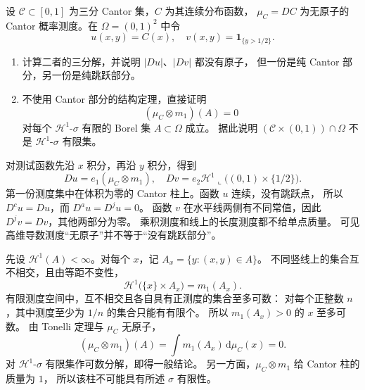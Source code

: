 \begin{exercise}\label{b1:ex:28-cantor-cylinder-and-atoms}
设 \(\mathcal C\subset[0,1]\) 为三分 Cantor 集，\(C\) 为其连续分布函数，
\(\mu_C=DC\) 为无原子的 Cantor 概率测度。在 \(\Omega=(0,1)^2\) 中令
\[
 u(x,y)=C(x),\quad v(x,y)=\mathbf1_{\{y>1/2\}}.
\]
\begin{enumerate}
\item\label{b1:item:28-cantor-cylinder-decomposition}
计算二者的三分解，并说明 \(|Du|\)、\(|Dv|\) 都没有原子，
但一份是纯 Cantor 部分，另一份是纯跳跃部分。
\item\label{b1:item:28-cantor-cylinder-diffuse}
不使用 Cantor 部分的结构定理，直接证明
\[
 (\mu_C\otimes m_1)(A)=0
\]
对每个 \(\mathcal H^1\)-\(\sigma\) 有限的 Borel 集 \(A\subset\Omega\) 成立。
据此说明 \((\mathcal C\times(0,1))\cap\Omega\) 不是
\(\mathcal H^1\)-\(\sigma\) 有限集。
\end{enumerate}
\end{exercise}
\begin{solution}
对测试函数先沿 \(x\) 积分，再沿 \(y\) 积分，得到
\[
 Du=e_1(\mu_C\otimes m_1),\quad
 Dv=e_2\mathcal H^1\llcorner\bigl((0,1)\times\{1/2\}\bigr).
\]
第一份测度集中在体积为零的 Cantor 柱上。函数 \(u\) 连续，没有跳跃点，
所以 \(D^cu=Du\)，而 \(D^au=D^ju=0\)。
函数 \(v\) 在水平线两侧有不同常值，因此 \(D^jv=Dv\)，其他两部分为零。
乘积测度和线上的长度测度都不给单点质量。
可见高维导数测度“无原子”并不等于“没有跳跃部分”。

先设 \(\mathcal H^1(A)<\infty\)。对每个 \(x\)，记
\(A_x=\{y:(x,y)\in A\}\)。
不同竖线上的集合互不相交，且由等距不变性，
\[
 \mathcal H^1\bigl(\{x\}\times A_x\bigr)=m_1(A_x).
\]
有限测度空间中，互不相交且各自具有正测度的集合至多可数：
对每个正整数 \(n\)，其中测度至少为 \(1/n\) 的集合只能有有限个。
所以 \(m_1(A_x)>0\) 的 \(x\) 至多可数。
由 Tonelli 定理与 \(\mu_C\) 无原子，
\[
 (\mu_C\otimes m_1)(A)=\int m_1(A_x)\,\mathrm d\mu_C(x)=0.
\]
对 \(\mathcal H^1\)-\(\sigma\) 有限集作可数分解，即得一般结论。
另一方面，\(\mu_C\otimes m_1\) 给 Cantor 柱的质量为 \(1\)，
所以该柱不可能具有所述 \(\sigma\) 有限性。
\end{solution}

